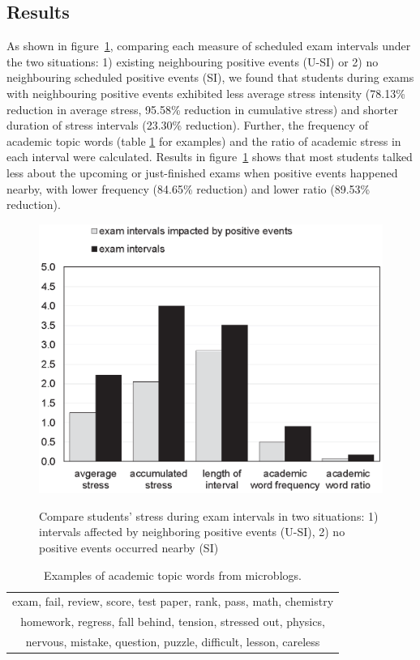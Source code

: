 \subsection{Results}
As shown in figure~\ref{fig:frequency}, 
comparing each measure of scheduled exam intervals under the two situations: 
1) existing neighbouring positive events (U-SI) or 2) no neighbouring scheduled positive events (SI), 
we found that students during exams with neighbouring positive events exhibited less average stress intensity
(78.13\% reduction in average stress, 95.58\%  reduction in cumulative stress)
and shorter duration of stress intervals (23.30\% reduction). 
Further, the frequency of academic topic words (table \ref{tab:studyWords} for examples) 
and the ratio of academic stress in each interval were calculated. 
Results in figure~\ref{fig:frequency} shows that most students talked less about the upcoming or just-finished exams when positive events happened nearby, 
with lower frequency (84.65\% reduction) and lower ratio (89.53\% reduction).

\begin{figure}[h]
\centering
\caption{\small{Compare students' stress during exam intervals in two situations:
1) intervals affected by neighboring positive events (U-SI), 2) no positive events occurred nearby (SI)}}
\includegraphics[width=0.8\linewidth]{figs/obnew-color.eps}
\label{fig:frequency}
\end{figure}


\begin{table}[h]
\centering
\caption{\small{Examples of academic topic words from microblogs.}}
\label{tab:studyWords}
\small{
\begin{tabular}{c}
\toprule
exam, fail, review, score, test paper, rank, pass, math, chemistry\\
homework, regress, fall behind, tension, stressed out, physics,\\
nervous, mistake, question, puzzle, difficult, lesson, careless\\
\bottomrule
\end{tabular}
}
\end{table}


